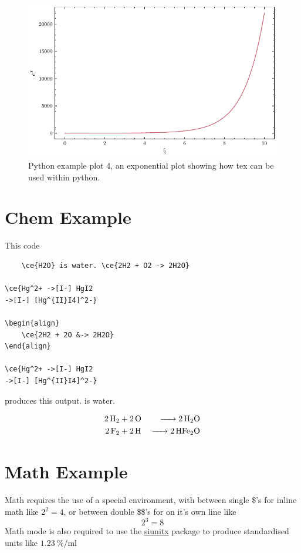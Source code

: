 \begin{figure}[h!]
    \centering
    \includegraphics{Python_plotting_example/example_4.pdf}
    \caption[Python example plot 4]{Python example plot 4, an exponential plot showing how tex can be used within python.}
    \label{fig:ch2/example_4}
\end{figure}

\section{Chem Example}
This code
\begin{lstlisting}
    \ce{H2O} is water. \ce{2H2 + O2 -> 2H2O}

\ce{Hg^2+ ->[I-] HgI2
->[I-] [Hg^{II}I4]^2-}

\begin{align}
    \ce{2H2 + 2O &-> 2H2O}
\end{align}

\ce{Hg^2+ ->[I-] HgI2
->[I-] [Hg^{II}I4]^2-}
\end{lstlisting}

produces this output. 
 is water. 


\begin{align}
    \ce{2H2& + 2O &-> 2H2O} \\
   \ce{2F2& + 2H &-> 2HFe2O}
\end{align}


\section{Math Example}
Math requires the use of a special environment, with between single \$'s for inline math like $2^2=4$, or between double \$\$'s for on it's own line like $$2^3=8$$ Math mode is also required to use the \href{https://mirror.aarnet.edu.au/pub/CTAN/macros/latex/contrib/siunitx/siunitx.pdf}{siunitx} package to produce standardised units like $\SI{1.23}{\percent\per\milli\litre}$

